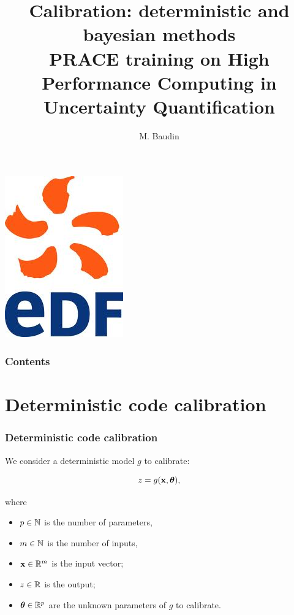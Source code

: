 \documentclass{beamer}
\title[PRACE/UQ: Calibration]{
Calibration: deterministic and bayesian methods \\
PRACE training on High Performance Computing in Uncertainty Quantification 
}
\author[Baudin]{
M. Baudin
}
\begin{document}

  \begin{frame}
  \titlepage
  
  \begin{center}
\includegraphics[height=0.15\textheight]{figures/edf.jpg}
\end{center}

  \end{frame}


\begin{frame}
\frametitle{Contents}
\tableofcontents
\end{frame}

\section{Deterministic code calibration}


\begin{frame}
\frametitle{Deterministic code calibration}

We consider a deterministic model $g$ to calibrate:

$$
z = g({\bf x}, \boldsymbol{\theta}),
$$

where

\begin{itemize}
\item $p \in\mathbb{N}$ is the number of parameters, 
\item $m \in\mathbb{N}$ is the number of inputs, 
\item ${\bf x} \in \mathbb{R}^{m}$ is the input vector;
\item $z \in \mathbb{R}$ is the output;
\item $\boldsymbol{\theta} \in \mathbb{R}^p$ are the unknown parameters of 
      $g$ to calibrate.
\end{itemize}

\end{frame}
\end{document}

